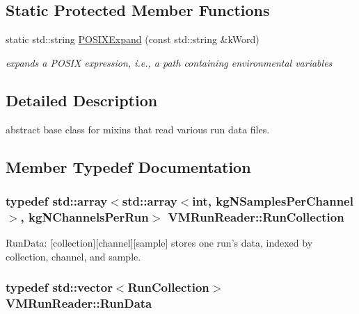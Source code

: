 \subsection*{Static Protected Member Functions}
\begin{DoxyCompactItemize}
\item 
static std\+::string \hyperlink{class_v_m_run_reader_aa073a42cf6eadf42fd9937d8c8f24dae}{P\+O\+S\+I\+X\+Expand} (const std\+::string \&k\+Word)
\begin{DoxyCompactList}\small\item\em expands a P\+O\+S\+I\+X expression, i.\+e., a path containing environmental variables \end{DoxyCompactList}\end{DoxyCompactItemize}


\subsection{Detailed Description}
abstract base class for mixins that read various run data files. 

\subsection{Member Typedef Documentation}
\hypertarget{class_v_m_run_reader_aca02fe95a36b6651ad0cf4bc7a8d02e4}{
\subsubsection[{Run\+Collection}]{\setlength{\rightskip}{0pt plus 5cm}typedef std\+::array$<$std\+::array$<$int, kg\+N\+Samples\+Per\+Channel$>$, kg\+N\+Channels\+Per\+Run$>$ {\bf V\+M\+Run\+Reader\+::\+Run\+Collection}\hspace{0.3cm}{\ttfamily [protected]}}}\label{class_v_m_run_reader_aca02fe95a36b6651ad0cf4bc7a8d02e4}
Run\+Data\+: \mbox{[}collection\mbox{]}\mbox{[}channel\mbox{]}\mbox{[}sample\mbox{]} stores one run's data, indexed by collection, channel, and sample. \hypertarget{class_v_m_run_reader_aa84c99e50235a10f563b3487b3930602}{
\subsubsection[{Run\+Data}]{\setlength{\rightskip}{0pt plus 5cm}typedef std\+::vector$<${\bf Run\+Collection}$>$ {\bf V\+M\+Run\+Reader\+::\+Run\+Data}\hspace{0.3cm}{\ttfamily [protected]}}}\label{class_v_m_run_reader_aa84c99e50235a10f563b3487b3930602}


